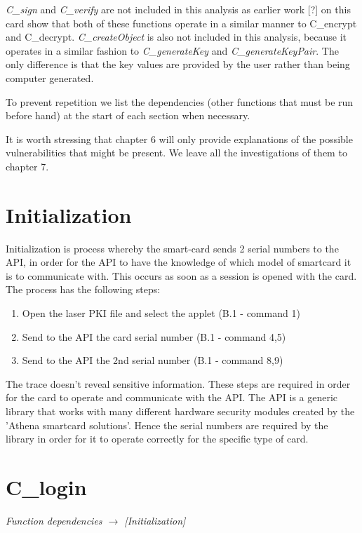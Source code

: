 \documentclass[bsc,frontabs,twoside,singlespacing,parskip,deptreport]{infthesis}     %
\begin{document}
\textit{C\_sign} and \textit{C\_verify} are not included in this analysis as earlier work [?] on this card show that both of these functions operate in a similar manner to C\_encrypt and C\_decrypt. \textit{C\_createObject} is also not included in this analysis, because it operates in a similar fashion to \textit{C\_generateKey} and \textit{C\_generateKeyPair}. The only difference is that the key values are provided by the user rather than being computer generated.

To prevent repetition we list the dependencies (other functions that must be run before hand) at the start of each section when necessary.

It is worth stressing that chapter 6 will only provide explanations of the possible vulnerabilities that might be present. We leave all the investigations of them to chapter 7.


\section{Initialization}

Initialization is process whereby the smart-card sends 2 serial numbers to the API, in order for the API to have the knowledge of which model of smartcard it is to communicate with. This occurs as soon as a session is opened with the card. The process has the following steps:
\begin{enumerate}
\item Open the laser PKI file and select the applet (B.1 - command 1)
\item Send to the API the card serial number (B.1 - command 4,5)
\item Send to the API the 2nd serial number (B.1 - command 8,9)
\end{enumerate}

The trace doesn't reveal sensitive information. These steps are required in order for the card to operate and communicate with the API. The API is a generic library that works with many different hardware security modules created by the 'Athena smartcard solutions'. Hence the serial numbers are required by the library in order for it to operate correctly for the specific type of card.

\section{C\_login}

\textit{Function dependencies $\rightarrow$ [Initialization]}\\
\end{document}
